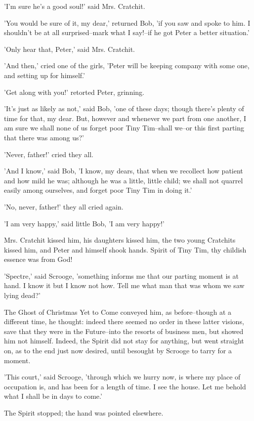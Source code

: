 'I'm sure he's a good soul!' said Mrs. Cratchit.

'You would be sure of it, my dear,' returned Bob, 'if you saw and spoke
to him. I shouldn't be at all surprised--mark what I say!--if he got
Peter a better situation.'

'Only hear that, Peter,' said Mrs. Cratchit.

'And then,' cried one of the girls, 'Peter will be keeping company with
some one, and setting up for himself.'

'Get along with you!' retorted Peter, grinning.

'It's just as likely as not,' said Bob, 'one of these days; though
there's plenty of time for that, my dear. But, however and whenever we
part from one another, I am sure we shall none of us forget poor Tiny
Tim--shall we--or this first parting that there was among us?'

'Never, father!' cried they all.

'And I know,' said Bob, 'I know, my dears, that when we recollect how
patient and how mild he was; although he was a little, little child; we
shall not quarrel easily among ourselves, and forget poor Tiny Tim in
doing it.'

'No, never, father!' they all cried again.

'I am very happy,' said little Bob, 'I am very happy!'

Mrs. Cratchit kissed him, his daughters kissed him, the two young
Cratchits kissed him, and Peter and himself shook hands. Spirit of Tiny
Tim, thy childish essence was from God!

'Spectre,' said Scrooge, 'something informs me that our parting moment
is at hand. I know it but I know not how. Tell me what man that was whom
we saw lying dead?'

The Ghost of Christmas Yet to Come conveyed him, as before--though at a
different time, he thought: indeed there seemed no order in these latter
visions, save that they were in the Future--into the resorts of business
men, but showed him not himself. Indeed, the Spirit did not stay for
anything, but went straight on, as to the end just now desired, until
besought by Scrooge to tarry for a moment.

'This court,' said Scrooge, 'through which we hurry now, is where my
place of occupation is, and has been for a length of time. I see the
house. Let me behold what I shall be in days to come.'

The Spirit stopped; the hand was pointed elsewhere.

